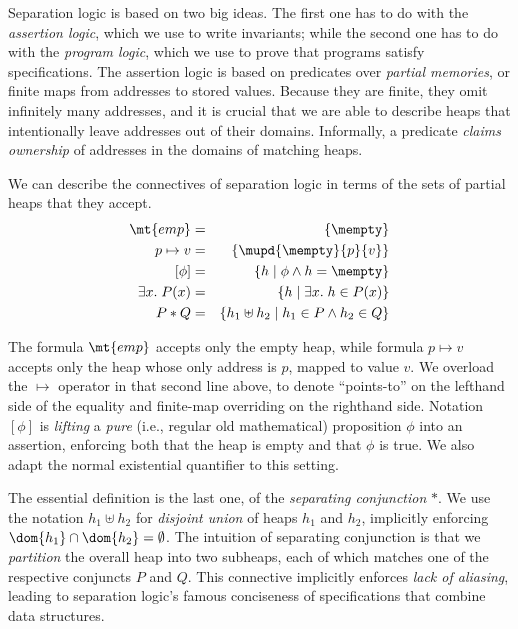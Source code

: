 \documentclass{amsbook}
\theoremstyle{definition}
\theoremstyle{remark}
\numberwithin{section}{chapter}
\numberwithin{equation}{chapter}
\begin{document}
Separation logic is based on two big ideas.
The first one has to do with the \emph{assertion logic}, which we use to write invariants; while the second one has to do with the \emph{program logic}, which we use to prove that programs satisfy specifications.
The assertion logic is based on predicates over \emph{partial memories}, or finite maps from addresses to stored values.
Because they are finite, they omit infinitely many addresses, and it is crucial that we are able to describe heaps that intentionally leave addresses out of their domains.
Informally, a predicate \emph{claims ownership} of addresses in the domains of matching heaps.

\newcommand{\emp}[0]{\mt{emp}}
\newcommand{\lift}[1]{[#1]}
\newcommand{\ptsto}[2]{#1 \mapsto #2}

We can describe the connectives of separation logic in terms of the sets of partial heaps that they accept.
\begin{eqnarray*}
  \emp &=& \{\mempty\} \\
  \ptsto{p}{v} &=& \{\mupd{\mempty}{p}{v}\} \\
  \lift{\phi} &=& \{h \mid \phi \land h = \mempty\} \\
  \exists x. \; P(x) &=& \{h \mid \exists x. \; h \in P(x)\} \\
  P * Q &=& \{h_1 \uplus h_2 \mid h_1 \in P \land h_2 \in Q\}
\end{eqnarray*}

The formula $\emp$ accepts only the empty heap, while formula $\ptsto{p}{v}$ accepts only the heap whose only address is $p$, mapped to value $v$.
We overload the $\mapsto$ operator in that second line above, to denote ``points-to'' on the lefthand side of the equality and finite-map overriding on the righthand side.
Notation $\lift{\phi}$ is \emph{lifting} a \emph{pure} (i.e., regular old mathematical) proposition $\phi$ into an assertion, enforcing both that the heap is empty and that $\phi$ is true.
We also adapt the normal existential quantifier to this setting.

The essential definition is the last one, of the \emph{separating conjunction} $*$.
We use the notation $h_1 \uplus h_2$ for \emph{disjoint union} of heaps $h_1$ and $h_2$, implicitly enforcing $\dom{h_1} \cap \dom{h_2} = \emptyset$.
The intuition of separating conjunction is that we \emph{partition} the overall heap into two subheaps, each of which matches one of the respective conjuncts $P$ and $Q$.
This connective implicitly enforces \emph{lack of aliasing}, leading to separation logic's famous conciseness of specifications that combine data structures.
\end{document}
